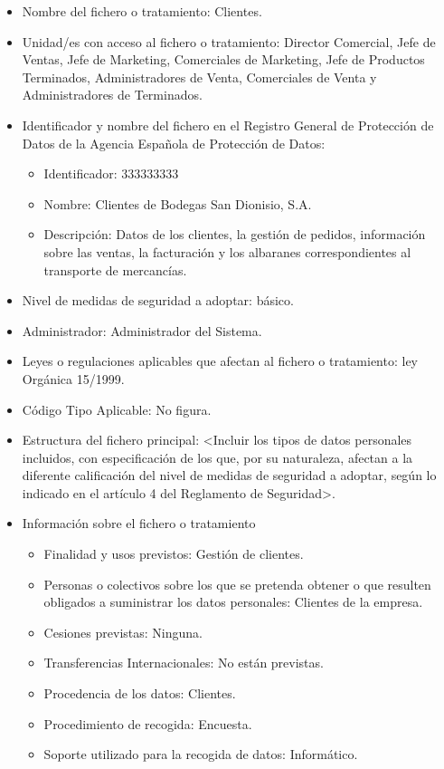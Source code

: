 \documentclass[a4paper,11pt,bibtotoc,noliststotoc]{scrbook}
\newcommand{\laorganizacion}{Bodegas San Dionisio, S.A.}
\begin{document}
\begin{itemize}
\item Nombre del fichero o tratamiento: Clientes.

\item Unidad/es con acceso al fichero o tratamiento: Director Comercial, Jefe de Ventas, Jefe de Marketing, Comerciales de Marketing, Jefe de Productos Terminados, Administradores de Venta, Comerciales de Venta y Administradores de Terminados.

\item Identificador y nombre del fichero en el Registro General de Protección de Datos de la Agencia Española de Protección de Datos:
	\begin{itemize}
	\item Identificador: 333333333
	\item Nombre: Clientes de \laorganizacion
	\item Descripción: Datos de los clientes, la gestión de pedidos, información sobre las ventas, la facturación y los albaranes correspondientes al transporte de mercancías.
	\end{itemize}

\item Nivel de medidas de seguridad a adoptar: básico.

\item Administrador: Administrador del Sistema.

\item Leyes o regulaciones aplicables que afectan al fichero o tratamiento: ley Orgánica 15/1999.

\item Código Tipo Aplicable: No figura.

\item Estructura del fichero principal: <Incluir los tipos de datos personales incluidos, con especificación de los que, por su naturaleza, afectan a la diferente calificación del nivel de medidas de seguridad a adoptar, según lo indicado en el artículo 4 del Reglamento de Seguridad>.

\item Información sobre el fichero o tratamiento
	\begin{itemize}
	\item Finalidad y usos previstos: Gestión de clientes.
	\item Personas o colectivos sobre los que se pretenda obtener o que resulten obligados a suministrar los datos personales: Clientes de la empresa.
	\item Cesiones previstas: Ninguna.
	\item Transferencias Internacionales: No están previstas.
	\item Procedencia de los datos: Clientes.
	\item Procedimiento de recogida: Encuesta.
	\item Soporte utilizado para la recogida de datos: Informático.
	\end{itemize}


\end{itemize}
\end{document}
